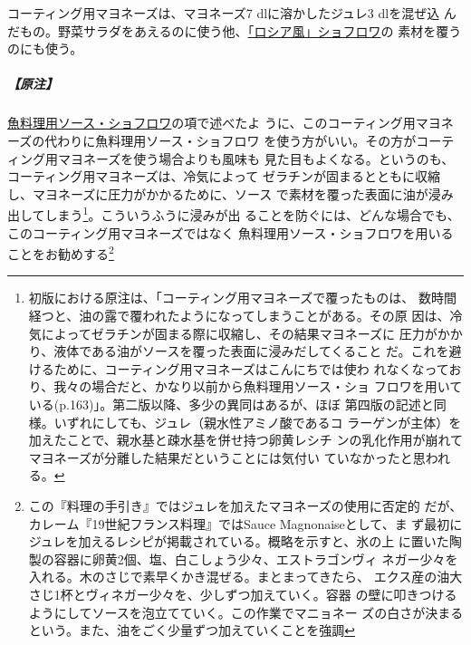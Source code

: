 \begin{recette}

コーティング用マヨネーズは、マヨネーズ7 dlに溶かしたジュレ3 dlを混ぜ込
んだもの。野菜サラダをあえるのに使う他、\protect\hyperlink{}{「ロシア風」ショフロワ}の
素材を覆うのにも使う。

\hypertarget{ux539fux6ce8-3}{%
\subparagraph{【原注】}\label{ux539fux6ce8-3}}

\protect\hyperlink{sauce-chaud-froid-maigre}{魚料理用ソース・ショフロワ}の項で述べたよ
うに、このコーティング用マヨネーズの代わりに魚料理用ソース・ショフロワ
を使う方がいい。その方がコーティング用マヨネーズを使う場合よりも風味も
見た目もよくなる。というのも、コーティング用マヨネーズは、冷気によって
ゼラチンが固まるとともに収縮し、マヨネーズに圧力がかかるために、ソース
で素材を覆った表面に油が浸み出してしまう\footnote{初版における原注は、「コーティング用マヨネーズで覆ったものは、
  数時間経つと、油の露で覆われたようになってしまうことがある。その原
  因は、冷気によってゼラチンが固まる際に収縮し、その結果マヨネーズに
  圧力がかかり、液体である油がソースを覆った表面に浸みだしてくること
  だ。これを避けるために、コーティング用マヨネーズはこんにちでは使わ
  れなくなっており、我々の場合だと、かなり以前から魚料理用ソース・ショ
  フロワを用いている(p.163)」。第二版以降、多少の異同はあるが、ほぼ
  第四版の記述と同様。いずれにしても、ジュレ（親水性アミノ酸であるコ
  ラーゲンが主体）を加えたことで、親水基と疎水基を併せ持つ卵黄レシチ
  ンの乳化作用が崩れてマヨネーズが分離した結果だということには気付い
  ていなかったと思われる。}。こういうふうに浸みが出
ることを防ぐには、どんな場合でも、このコーティング用マヨネーズではなく
魚料理用ソース・ショフロワを用いることをお勧めする\footnote{この『料理の手引き』ではジュレを加えたマヨネーズの使用に否定的
  だが、カレーム『19世紀フランス料理』ではSauce Magnonaiseとして、ま
  ず最初にジュレを加えるレシピが掲載されている。概略を示すと、氷の上
  に置いた陶製の容器に卵黄2個、塩、白こしょう少々、エストラゴンヴィ
  ネガー少々を入れる。木のさじで素早くかき混ぜる。まとまってきたら、
  エクス産の油大さじ1杯とヴィネガー少々を、少しずつ加えていく。容器
  の壁に叩きつけるようにしてソースを泡立てていく。この作業でマニョネー
  ズの白さが決まるという。また、油をごく少量ずつ加えていくことを強調
}
\end{recette}
